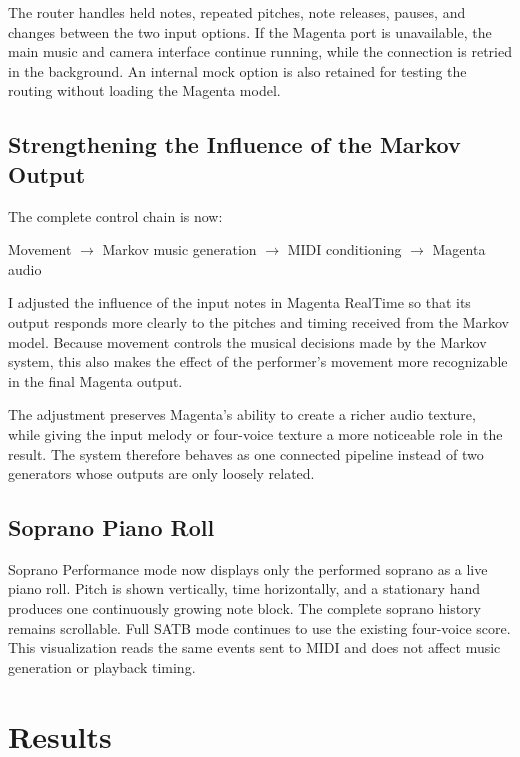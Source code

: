 \documentclass[11pt,a4paper]{article}
\begin{document}
The router handles held notes, repeated pitches, note releases, pauses, and
changes between the two input options. If the Magenta port is unavailable, the
main music and camera interface continue running, while the connection is
retried in the background. An internal mock option is also retained for testing
the routing without loading the Magenta model.

\subsection{Strengthening the Influence of the Markov Output}

The complete control chain is now:

\begin{center}
Movement $\longrightarrow$ Markov music generation
$\longrightarrow$ MIDI conditioning $\longrightarrow$ Magenta audio
\end{center}

I adjusted the influence of the input notes in Magenta RealTime so that its
output responds more clearly to the pitches and timing received from the
Markov model. Because movement controls the musical decisions made by the
Markov system, this also makes the effect of the performer's movement more
recognizable in the final Magenta output.

The adjustment preserves Magenta's ability to create a richer audio texture,
while giving the input melody or four-voice texture a more noticeable role in
the result. The system therefore behaves as one connected pipeline instead of
two generators whose outputs are only loosely related.

\subsection{Soprano Piano Roll}

Soprano Performance mode now displays only the performed soprano as a live
piano roll. Pitch is shown vertically, time horizontally, and a stationary
hand produces one continuously growing note block. The complete soprano
history remains scrollable. Full SATB mode continues to use the existing
four-voice score. This visualization reads the same events sent to MIDI and
does not affect music generation or playback timing.

\section{Results}
\end{document}
